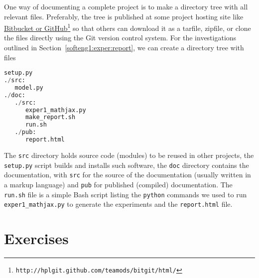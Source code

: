 \documentclass[graybox,sectrefs,envcountresetchap,open=right,final]{svmonodo}
\begin{document}
One way of documenting a complete project is to make a directory tree
with all relevant files. Preferably, the tree is published at
some project hosting site like \href{{http://hplgit.github.com/teamods/bitgit/html/}}{Bitbucket or GitHub}\footnote{\texttt{http://hplgit.github.com/teamods/bitgit/html/}} so that others can download it
as a tarfile, zipfile, or clone the files directly using the Git version control
system.
For the investigations outlined in Section~\ref{softeng1:exper:report},
we can create a directory tree with files
\begin{lstlisting}[language=Python,style=blue1_bluegreen]
setup.py
./src:
   model.py
./doc:
   ./src:
      exper1_mathjax.py
      make_report.sh
      run.sh
   ./pub:
      report.html
\end{lstlisting}
The \texttt{src} directory holds source code (modules) to be reused in other projects,
the \texttt{setup.py} script builds and installs such software,
the \texttt{doc} directory contains the documentation, with \texttt{src} for the
source of the documentation (usually written in a markup language)
and \texttt{pub} for published (compiled) documentation.
The \texttt{run.sh} file is a simple Bash script listing the \texttt{python} commands
we used to run \Verb!exper1_mathjax.py! to generate the experiments and
the \texttt{report.html} file.



\section{Exercises}
\end{document}
